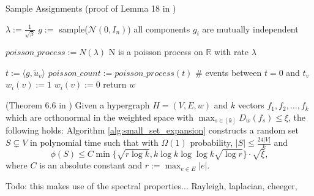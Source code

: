 \begin{algorithm}[htpb]
	\caption{Sample Assignments (proof of Lemma 18 in \cite{LouisM14}) \label{alg:sample_assignments}} 
	\begin{algorithmic}
		\State $\lambda := \frac{1}{\sqrt{\beta}}$
			\State $g:=$ sample($\mathcal{N}(0,I_n)$) \Comment all components $g_i$ are mutually independent 
	
	\State $poisson\_process := N(\lambda)$ \Comment N is a poisson process on $\mathbb{R}$ with rate $\lambda$
		 
	
	
	\State $t := \langle g, \tilde{u}_v \rangle $
	\State $poisson\_count := poisson\_process(t)$ \Comment \# events between $t=0$ and $t_v$
	\State $w_i(v) := 1$
	\Else
	\State  $w_i(v) := 0$
	\EndIf
	\EndFor
	\EndFor
	\State return $w$
	\EndFunction %
\end{algorithmic}
\end{algorithm}	
\begin{fact}{(Theorem 6.6 in \cite{ChanLTZ16})}\label{fact:small_xi}
	Given a hypergraph $H = (V, E, w)$ and $k$ vectors $f_1, f_2, \ldots , f_k$ which are orthonormal in the weighted space with $ \max_{s \in [k]} D_w(f_s) \le \xi $, the following holds: Algorithm \ref{alg:small_set_expansion} constructs a random set $S \subsetneq V$ in polynomial time such that with $\Omega(1)$ probability, $|S| \le \frac{24|V|}{k}$ and
	 \begin{equation}\label{eq:small_expansion}
	 \phi(S) \le C \min\{\sqrt{r \log k}, k \log k  \log \log k \sqrt{\log r} \} \cdot \sqrt{\xi},
	 \end{equation}
	 where $C$ is an absolute constant and $r := \max_{e\in E} |e|$.
\end{fact}



Todo: this makes use of the spectral properties... Rayleigh, laplacian, cheeger, 







